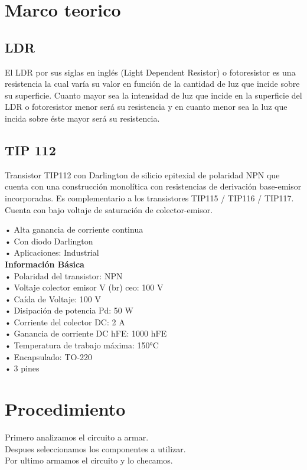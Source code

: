\documentclass[12pt,a4paper]{article}
\begin{document}
\section{Marco teorico}
\subsection{LDR}
El LDR por sus siglas en inglés (Light Dependent Resistor) o fotoresistor es una resistencia la cual varía su valor en función de la cantidad de luz que incide sobre su superficie. Cuanto mayor sea la intensidad de luz que incide en la superficie del LDR o fotoresistor menor será su resistencia y en cuanto menor sea la luz que incida sobre éste mayor será su resistencia.

\subsection{TIP 112}
Transistor TIP112 con Darlington de silicio epitexial de polaridad NPN que cuenta con una construcción monolítica con resistencias de derivación base-emisor incorporadas. Es complementario a los transistores TIP115 / TIP116 / TIP117. Cuenta con bajo voltaje de saturación de colector-emisor.


    • Alta ganancia de corriente continua\\
    • Con diodo Darlington\\
    • Aplicaciones: Industrial\\
\textbf{Información Básica}\\
    • Polaridad del transistor: NPN\\
    • Voltaje colector emisor V (br) ceo: 100 V\\
    • Caída de Voltaje: 100 V\\
    • Disipación de potencia Pd: 50 W\\
    • Corriente del colector DC: 2 A\\
    • Ganancia de corriente DC hFE: 1000 hFE\\
    • Temperatura de trabajo máxima: 150°C\\
    • Encapsulado: TO-220\\
    • 3 pines\\


\section{Procedimiento}
Primero analizamos el circuito a armar.\\
Despues seleccionamos los componentes a utilizar.\\
Por ultimo armamos el circuito y lo checamos.\\
\end{document}
